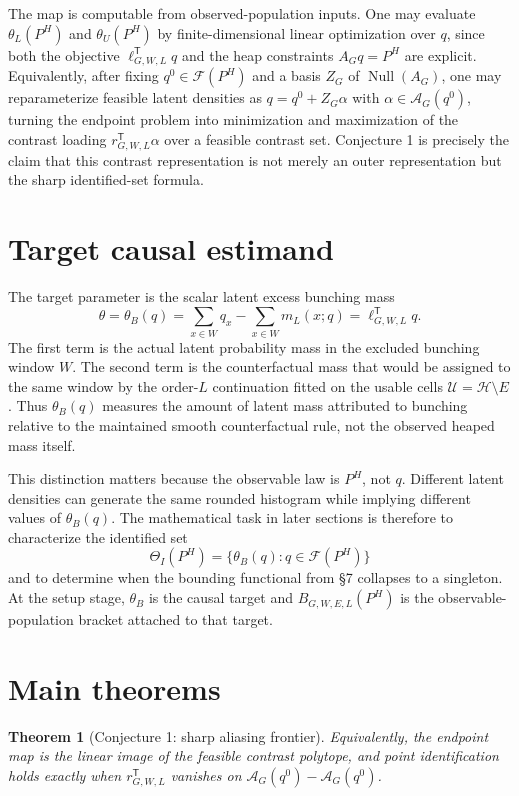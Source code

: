 \documentclass[11pt]{article}
\newcommand{\transpose}{\mathsf{T}}
\theoremstyle{definition}
\theoremstyle{plain}
\newtheorem{theorem}{Theorem}
\theoremstyle{remark}
\begin{document}
The map is computable from observed-population inputs.  One may evaluate \(\theta_L(P^H)\) and \(\theta_U(P^H)\) by finite-dimensional linear optimization over \(q\), since both the objective \(\ell_{G,W,L}^{\transpose}q\) and the heap constraints \(A_Gq=P^H\) are explicit.  Equivalently, after fixing \(q^0\in\mathcal{F}(P^H)\) and a basis \(Z_G\) of \(\operatorname{Null}(A_G)\), one may reparameterize feasible latent densities as \(q=q^0+Z_G\alpha\) with \(\alpha\in\mathcal{A}_G(q^0)\), turning the endpoint problem into minimization and maximization of the contrast loading \(r_{G,W,L}^{\transpose}\alpha\) over a feasible contrast set.  Conjecture 1 is precisely the claim that this contrast representation is not merely an outer representation but the sharp identified-set formula.

\section{Target causal estimand}
The target parameter is the scalar latent excess bunching mass
\[
\theta=\theta_B(q)=\sum_{x\in W} q_x-\sum_{x\in W} m_L(x;q)=\ell_{G,W,L}^{\transpose}q.
\]
The first term is the actual latent probability mass in the excluded bunching window \(W\).  The second term is the counterfactual mass that would be assigned to the same window by the order-\(L\) continuation fitted on the usable cells \(\mathcal{U}=\mathcal{H}\setminus E\).  Thus \(\theta_B(q)\) measures the amount of latent mass attributed to bunching relative to the maintained smooth counterfactual rule, not the observed heaped mass itself.

This distinction matters because the observable law is \(P^H\), not \(q\).  Different latent densities can generate the same rounded histogram while implying different values of \(\theta_B(q)\).  The mathematical task in later sections is therefore to characterize the identified set
\[
\Theta_I(P^H)=\{\theta_B(q):q\in\mathcal{F}(P^H)\}
\]
and to determine when the bounding functional from \S7 collapses to a singleton.  At the setup stage, \(\theta_B\) is the causal target and \(B_{G,W,E,L}(P^H)\) is the observable-population bracket attached to that target.

\section{Main theorems}
\begin{theorem}[Conjecture 1: sharp aliasing frontier]\label{thm:frontier}
Equivalently, the endpoint map is the linear image of the feasible contrast polytope, and point identification holds exactly when \(r_{G,W,L}^{\transpose}\) vanishes on \(\mathcal{A}_G(q^0)-\mathcal{A}_G(q^0)\).
\end{theorem}
\end{document}
